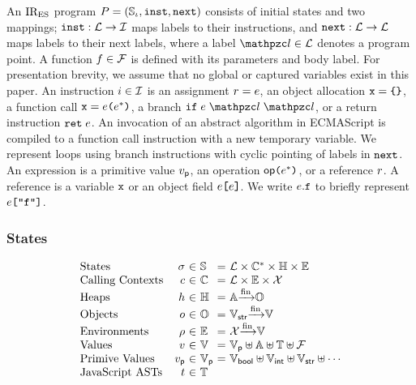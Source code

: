 An $\text{IR}_\text{ES}$ program $P = (\mathbb{S}_\iota, \texttt{inst}, \texttt{next})$ consists of initial
states and two mappings; $\texttt{inst}: \mathcal{L} \rightarrow \mathcal{I}$ maps labels to
their instructions, and $\texttt{next}: \mathcal{L} \rightarrow \mathcal{L}$ maps labels to
their next labels, where a label $\lab \in \labset$ denotes a program point.  A
function $f \in \mathcal{F}$ is defined with its parameters and body label.
For presentation brevity, we assume that no global or captured variables exist
in this paper.  An instruction $i \in \mathcal{I}$ is an assignment $r =
e$, an object allocation $\texttt{x} = \texttt{\{} \texttt{\}}$,  a function call $\texttt{x} =
e \texttt{(} e^* \texttt{)}$, a branch $\kwif \; \expr \; \lab \; \lab$, or a
return instruction $\texttt{ret} \; e$.  An invocation of an abstract algorithm in
ECMAScript is compiled to a function call instruction with a new temporary
variable.  We represent loops using branch instructions with cyclic pointing of
labels in $\texttt{next}$.  An expression is a primitive value $v_{\textsf{p}}$, an operation
$\textsf{op} \texttt{(} e^* \texttt{)}$, or a reference $r$.  A reference is a variable
$\texttt{x}$ or an object field $e \texttt{[} e \texttt{]}$.  We write $e.\texttt{f}$ to
briefly represent $e \texttt{[} \texttt{"f"} \texttt{]}$.


\subsubsection{States}

\[
  \begin{array}{lr@{~}c@{~}l@{~}c@{~}l}
    \text{States} & \st &\in& \stset &=&
    \labset \times \ctxtset^* \times \heapset \times \envset\\

    \text{Calling Contexts} & \ctxt &\in& \ctxtset &=&
    \labset \times \envset \times \varset\\

    \text{Heaps} & \heap &\in& \heapset &=&
    \addrset \finmap \objset\\

    \text{Objects} & \obj &\in& \objset &=&
    \strset \finmap \valset\\

    \text{Environments} & \env &\in& \envset &=&
    \varset \finmap \valset\\

    \text{Values} & \val &\in& \valset &=&
    \pvalset \uplus \addrset \uplus \treeset \uplus \funcset\\

    \text{Primive Values} & \pval &\in& \pvalset &=&
    \boolset \uplus \intset \uplus \strset \uplus \cdots\\

    \text{JavaScript ASTs} & \tree &\in& \treeset\\
  \end{array}
\]

